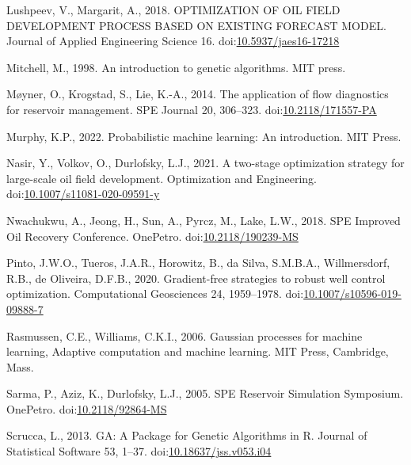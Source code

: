 \documentclass[]{elsarticle} %
\newlength{\cslhangindent}
\newenvironment{CSLReferences}[2] %
 {%
  \setlength{\parindent}{0pt}
  \ifodd #1 \everypar{\setlength{\hangindent}{\cslhangindent}}\ignorespaces\fi
  \ifnum #2 > 0
  \setlength{\parskip}{#2\baselineskip}
  \fi
 }%
 {}
\begin{document}
\begin{CSLReferences}{1}{0}
\leavevmode{}%
Lushpeev, V., Margarit, A., 2018. OPTIMIZATION OF OIL FIELD DEVELOPMENT PROCESS BASED ON EXISTING FORECAST MODEL. Journal of Applied Engineering Science 16. doi:\href{https://doi.org/10.5937/jaes16-17218}{10.5937/jaes16-17218}

\leavevmode{}%
Mitchell, M., 1998. An introduction to genetic algorithms. MIT press.

\leavevmode{}%
Møyner, O., Krogstad, S., Lie, K.-A., 2014. The application of flow diagnostics for reservoir management. SPE Journal 20, 306--323. doi:\href{https://doi.org/10.2118/171557-PA}{10.2118/171557-PA}

\leavevmode{}%
Murphy, K.P., 2022. Probabilistic machine learning: An introduction. MIT Press.

\leavevmode{}%
Nasir, Y., Volkov, O., Durlofsky, L.J., 2021. A two-stage optimization strategy for large-scale oil field development. Optimization and Engineering. doi:\href{https://doi.org/10.1007/s11081-020-09591-y}{10.1007/s11081-020-09591-y}

\leavevmode{}%
Nwachukwu, A., Jeong, H., Sun, A., Pyrcz, M., Lake, L.W., 2018. SPE Improved Oil Recovery Conference. OnePetro. doi:\href{https://doi.org/10.2118/190239-MS}{10.2118/190239-MS}

\leavevmode{}%
Pinto, J.W.O., Tueros, J.A.R., Horowitz, B., da Silva, S.M.B.A., Willmersdorf, R.B., de Oliveira, D.F.B., 2020. Gradient-free strategies to robust well control optimization. Computational Geosciences 24, 1959--1978. doi:\href{https://doi.org/10.1007/s10596-019-09888-7}{10.1007/s10596-019-09888-7}

\leavevmode{}%
Rasmussen, C.E., Williams, C.K.I., 2006. Gaussian processes for machine learning, Adaptive computation and machine learning. MIT Press, Cambridge, Mass.

\leavevmode{}%
Sarma, P., Aziz, K., Durlofsky, L.J., 2005. SPE Reservoir Simulation Symposium. OnePetro. doi:\href{https://doi.org/10.2118/92864-MS}{10.2118/92864-MS}

\leavevmode{}%
Scrucca, L., 2013. GA: A Package for Genetic Algorithms in R. Journal of Statistical Software 53, 1--37. doi:\href{https://doi.org/10.18637/jss.v053.i04}{10.18637/jss.v053.i04}


\end{CSLReferences}
\end{document}
